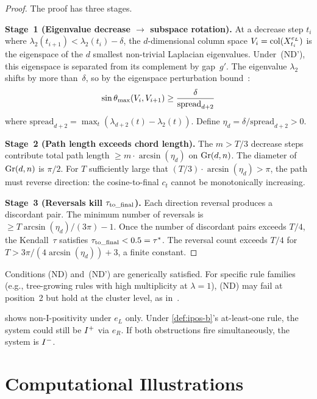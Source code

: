 \documentclass{../shared/primo}
\begin{document}
\begin{proof}
The proof has three stages.

\textbf{Stage~1 (Eigenvalue decrease $\to$ subspace rotation).} At a decrease step $t_i$ where $\lambda_2(t_{i+1}) < \lambda_2(t_i) - \delta$, the $d$-dimensional column space $V_i = \operatorname{col}(X^{e_L}_{t_i})$ is the eigenspace of the $d$ smallest non-trivial Laplacian eigenvalues. Under~(ND'), this eigenspace is separated from its complement by gap~$g'$. The eigenvalue $\lambda_2$ shifts by more than~$\delta$, so by the eigenspace perturbation bound~\cite{stewart1990matrix}:
\[
\sin\theta_{\max}(V_i, V_{i+1}) \geq \frac{\delta}{\mathrm{spread}_{d+2}}
\]
where $\mathrm{spread}_{d+2} = \max_t(\lambda_{d+2}(t) - \lambda_2(t))$. Define $\eta_d = \delta / \mathrm{spread}_{d+2} > 0$.

\textbf{Stage~2 (Path length exceeds chord length).} The $m > T/3$ decrease steps contribute total path length $\geq m \cdot \arcsin(\eta_d)$ on $\operatorname{Gr}(d, n)$. The diameter of $\operatorname{Gr}(d, n)$ is $\pi/2$. For $T$ sufficiently large that $(T/3) \cdot \arcsin(\eta_d) > \pi$, the path must reverse direction: the cosine-to-final $c_t$ cannot be monotonically increasing.

\textbf{Stage~3 (Reversals kill $\tau_{\mathrm{to\_final}}$).} Each direction reversal produces a discordant pair. The minimum number of reversals is $\geq T \arcsin(\eta_d) / (3\pi) - 1$. Once the number of discordant pairs exceeds $T/4$, the Kendall~$\tau$ satisfies $\tau_{\mathrm{to\_final}} < 0.5 = \tau^*$. The reversal count exceeds $T/4$ for $T > 3\pi / (4\arcsin(\eta_d)) + 3$, a finite constant.
\end{proof}

\begin{remark}
Conditions (ND) and~(ND') are generically satisfied. For specific rule families (e.g., tree-growing rules with high multiplicity at $\lambda = 1$), (ND) may fail at position~2 but hold at the cluster level, as in~\cite{kowalczyk2026predicates}.
\end{remark}

\begin{remark}
 shows non-I-positivity under $e_L$ only. Under \cref{def:ipos-b}'s at-least-one rule, the system could still be $I\textsuperscript{+}$ via $e_R$. If both obstructions fire simultaneously, the system is $I\textsuperscript{$-$}$.
\end{remark}


\section{Computational Illustrations}
\label{sec:examples}
\end{document}
